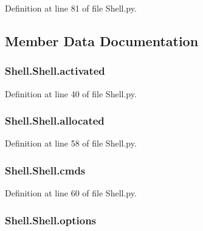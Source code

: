 Definition at line 81 of file Shell.\-py.



\subsection{Member Data Documentation}
\hypertarget{class_shell_1_1_shell_a5869d648354d59617e4a9836ef0c4ba3}{
\subsubsection[{activated}]{\setlength{\rightskip}{0pt plus 5cm}Shell.\-Shell.\-activated}}\label{class_shell_1_1_shell_a5869d648354d59617e4a9836ef0c4ba3}


Definition at line 40 of file Shell.\-py.

\hypertarget{class_shell_1_1_shell_a7d3526fa682799bd7be51fa09c2c9017}{
\subsubsection[{allocated}]{\setlength{\rightskip}{0pt plus 5cm}Shell.\-Shell.\-allocated}}\label{class_shell_1_1_shell_a7d3526fa682799bd7be51fa09c2c9017}


Definition at line 58 of file Shell.\-py.

\hypertarget{class_shell_1_1_shell_abe2dca7284b995f29494ae5e2ea975a7}{
\subsubsection[{cmds}]{\setlength{\rightskip}{0pt plus 5cm}Shell.\-Shell.\-cmds}}\label{class_shell_1_1_shell_abe2dca7284b995f29494ae5e2ea975a7}


Definition at line 60 of file Shell.\-py.

\hypertarget{class_shell_1_1_shell_a3e2a9754ac3fa0e2a00c5f0861ef85f2}{
\subsubsection[{options}]{\setlength{\rightskip}{0pt plus 5cm}Shell.\-Shell.\-options}}\label{class_shell_1_1_shell_a3e2a9754ac3fa0e2a00c5f0861ef85f2}


